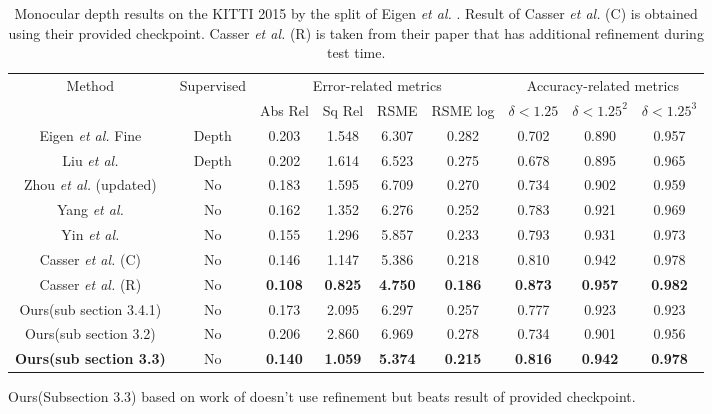 \documentclass[10pt,twocolumn,letterpaper]{article}
\begin{document}
\begin{table}[htbp]
\centering
\begin{tabular}{ c||c| c c c c|c c c  }
 \hline
  \multirow{2}{*}{Method} & \multirow{2}{*}{Supervised} & \multicolumn{4}{c|}{Error-related metrics} & \multicolumn{3}{c}{Accuracy-related metrics}\\
  &   & Abs Rel & Sq Rel & RSME & RSME log & $\delta < 1.25$ & $\delta < 1.25^2$ & $\delta < 1.25^3$\\
 \hline
 
  Eigen \textit{et al.} \cite{eigen2014depth} Fine & Depth & 0.203 & 1.548 & 6.307 & 0.282 & 0.702 & 0.890 & 0.957 \\

  Liu \textit{et al.}  \cite{liu2016learning} & Depth & 0.202 & 1.614 & 6.523 & 0.275 & 0.678 & 0.895 & 0.965 \\

  Zhou \textit{et al.} \cite{zhou2017unsupervised}(updated) & No & 0.183 & 1.595 & 6.709 & 0.270 & 0.734 & 0.902 & 0.959\\
  
  Yang \textit{et al.} \cite{yang2018lego} & No & 0.162 & 1.352 & 6.276 & 0.252 & 0.783 & 0.921 & 0.969\\

  Yin \textit{et al.} \cite{yin2018geonet} & No & 0.155 & 1.296 & 5.857 & 0.233 & 0.793 & 0.931 & 0.973 \\
  
  Casser \textit{et al.} \cite{casser2018depth}(C) & No & 0.146 & 1.147 & 5.386 & 0.218 & 0.810 & 0.942 & 0.978 \\
 
  Casser \textit{et al.} \cite{casser2018depth}(R) & No & \textbf{0.108} & \textbf{0.825} & \textbf{4.750} & \textbf{0.186} & \textbf{0.873} & \textbf{0.957} & \textbf{0.982} \\

  \hline

  Ours(sub section 3.4.1) & No & 0.173 & 2.095
 & 6.297 & 0.257 & 0.777 & 0.923 & 0.923 \\
  Ours(sub section 3.2) & No &  0.206 & 2.860 & 6.969 & 0.278 & 0.734 & 0.901 &     0.956 \\
  
  \textbf{Ours(sub section 3.3)} & No & \textbf{0.140} &     \textbf{1.059} &     \textbf{5.374} &     \textbf{0.215} &     \textbf{0.816} &     \textbf{0.942} &     \textbf{0.978}\\
 \hline
\end{tabular}
\caption{Monocular depth results on the KITTI 2015 \cite{kitti} by the split of Eigen \textit{et al.} \cite{eigen2014depth}. Result of Casser \textit{et al.} (C) is obtained using their provided checkpoint. Casser \textit{et al.} (R) is taken from their paper that has additional refinement during test time.} Ours(Subsection 3.3) based on work of \cite{casser2018depth} doesn't use refinement but beats result of provided checkpoint. \label{tab:depth_pred}
\end{table}
\end{document}
